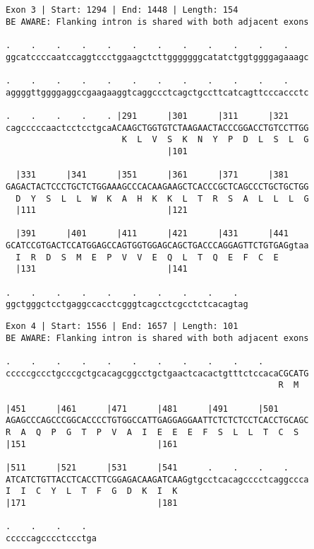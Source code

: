 \documentclass{article}
\begin{document}
\begin{Verbatim}[fontfamily=courier]
Exon 3 | Start: 1294 | End: 1448 | Length: 154
BE AWARE: Flanking intron is shared with both adjacent exons

.    .    .    .    .    .    .    .    .    .    .    .    
ggcatccccaatccaggtccctggaagctcttgggggggcatatctggtggggagaaagc

.    .    .    .    .    .    .    .    .    .    .    .    
aggggttggggaggccgaagaaggtcaggccctcagctgccttcatcagttcccaccctc

.    .    .    .    . |291      |301      |311      |321    
cagcccccaactcctcctgcaACAAGCTGGTGTCTAAGAACTACCCGGACCTGTCCTTGG
                       K  L  V  S  K  N  Y  P  D  L  S  L  G
                                |101                        

  |331      |341      |351      |361      |371      |381    
GAGACTACTCCCTGCTCTGGAAAGCCCACAAGAAGCTCACCCGCTCAGCCCTGCTGCTGG
  D  Y  S  L  L  W  K  A  H  K  K  L  T  R  S  A  L  L  L  G
  |111                          |121                        

  |391      |401      |411      |421      |431      |441    
GCATCCGTGACTCCATGGAGCCAGTGGTGGAGCAGCTGACCCAGGAGTTCTGTGAGgtaa
  I  R  D  S  M  E  P  V  V  E  Q  L  T  Q  E  F  C  E      
  |131                          |141                        

.    .    .    .    .    .    .    .    .    .  
ggctgggctcctgaggccacctcgggtcagcctcgcctctcacagtag
\end{Verbatim}
\newpage
\begin{Verbatim}[fontfamily=courier]
Exon 4 | Start: 1556 | End: 1657 | Length: 101
BE AWARE: Flanking intron is shared with both adjacent exons

.    .    .    .    .    .    .    .    .    .    .         
cccccgccctgcccgctgcacagcggcctgctgaactcacactgtttctccacaCGCATG
                                                      R  M  

|451      |461      |471      |481      |491      |501      
AGAGCCCAGCCCGGCACCCCTGTGGCCATTGAGGAGGAATTCTCTCTCCTCACCTGCAGC
R  A  Q  P  G  T  P  V  A  I  E  E  E  F  S  L  L  T  C  S  
|151                          |161                          

|511      |521      |531      |541      .    .    .    .    
ATCATCTGTTACCTCACCTTCGGAGACAAGATCAAGgtgcctcacagcccctcaggccca
I  I  C  Y  L  T  F  G  D  K  I  K                          
|171                          |181                          

.    .    .    .  
cccccagcccctccctga
\end{Verbatim}
\end{document}
